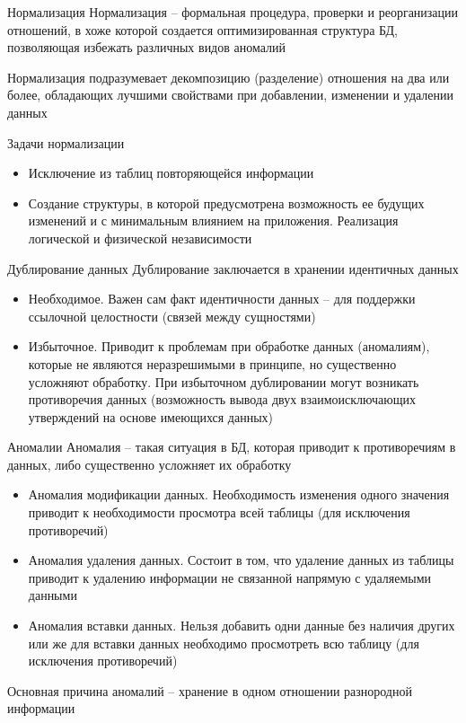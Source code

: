 \documentclass[12pt]{article}
\begin{document}
\begin{defin}{Нормализация}
    Нормализация -- формальная процедура, проверки и реорганизации отношений, в хоже которой создается оптимизированная структура БД, позволяющая избежать различных видов аномалий 

    Нормализация подразумевает декомпозицию (разделение) отношения на два или более, обладающих лучшими свойствами при добавлении, изменении и удалении данных
\end{defin}

\begin{nota}{Задачи нормализации}
    \begin{itemize}
        \item Исключение из таблиц повторяющейся информации 
        \item Создание структуры, в которой предусмотрена возможность ее будущих изменений и с минимальным влиянием на приложения. Реализация логической и физической независимости 
    \end{itemize}
\end{nota}

\begin{defin}{Дублирование данных}
    Дублирование заключается в хранении идентичных данных 

    \begin{itemize}
        \item Необходимое. Важен сам факт идентичности данных -- для поддержки ссылочной целостности (связей между сущностями) 
        \item Избыточное. Приводит к проблемам при обработке данных (аномалиям), которые не являются неразрешимыми в принципе, но существенно усложняют обработку. При избыточном дублировании могут возникать противоречия данных (возможность вывода двух взаимоисключающих утверждений на основе имеющихся данных)
    \end{itemize}
\end{defin}

\begin{defin}{Аномалии}
    Аномалия -- такая ситуация в БД, которая приводит к противоречиям в данных, либо существенно усложняет их обработку 

    \begin{itemize}
        \item Аномалия модификации данных. Необходимость изменения одного значения приводит к необходимости просмотра всей таблицы (для исключения противоречий)
        \item Аномалия удаления данных. Состоит в том, что удаление данных из таблицы приводит к удалению информации не связанной напрямую с удаляемыми данными 
        \item Аномалия вставки данных. Нельзя добавить одни данные без наличия других или же для вставки данных необходимо просмотреть всю таблицу (для исключения противоречий)
    \end{itemize}

    Основная причина аномалий -- хранение в одном отношении разнородной информации 
\end{defin}
\end{document}

